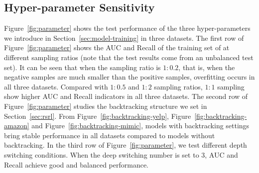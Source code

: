 \subsection{Hyper-parameter Sensitivity}\label{sec:hyper-parameter}
Figure~\ref{fig:parameter} shows the test performance of the three hyper-parameters we introduce in Section~\ref{sec:model-training} in three datasets.
The first row of Figure~\ref{fig:parameter} shows the AUC and Recall of the training set of \RioGNN at different sampling ratios (note that the test results come from an unbalanced test set). 
It can be seen that when the sampling ratio is $1:0.2$, that is, when the negative samples are much smaller than the positive samples, overfitting occurs in all three datasets. 
Compared with $1:0.5$ and $1:2$ sampling ratios, $1:1$ sampling show higher AUC and Recall indicators in all three datasets.
The second row of Figure~\ref{fig:parameter} studies the backtracking structure we set in Section~\ref{sec:rsrl}. 
From Figure~\ref{fig:backtracking-yelp}, Figure~\ref{fig:backtracking-amazon} and Figure~\ref{fig:backtracking-mimic}, models with backtracking settings bring stable performance in all datasets compared to models without backtracking.
In the third row of Figure~\ref{fig:parameter}, we test different depth switching conditions. 
When the deep switching number is set to $3$, AUC and Recall achieve good and balanced performance.





